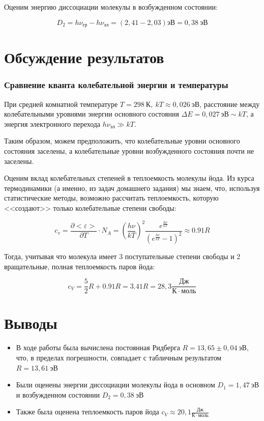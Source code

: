 \documentclass[a4paper,12pt]{article}
\begin{document}
Оценим энергию диссоциации молекулы в возбужденном состоянии:

$$
	D_2 = h\nu_{гр} -  h\nu_{эл} = (2,41 - 2,03) эВ = 0,38 \ эВ
$$

\section*{Обсуждение результатов}

\subsubsection*{Сравнение кванта колебательной энергии и температуры}

При средней комнатной температуре $T = 298 \ К, \ kT \approx 0,026 \ эВ$, расстояние между колебательными уровнями энергии основного состояния $\Delta E = 0,027 \ эВ \sim kT$, а энергия электронного перехода $h\nu_{эл} \gg kT$. 

Таким образом, можем предположить, что колебательные уровни основного состояния заселены, а колебательные уровни возбужденного состояния почти не заселены.

Оценим вклад колебательных степеней в теплоемкость молекулы йода. Из курса термодинамики (а именно, из задач домашнего задания) мы знаем, что, используя статистические методы, возможно рассчитать теплоемкость, которую <<создают>> только колебательные степени свободы:

$$
	c_v = \frac{\partial <\varepsilon>}{\partial T} \cdot N_A = \left(\frac{h\nu}{kT}\right)^2 \frac{e^{\frac{h\nu}{kT}}}{(e^{\frac{h\nu}{kT}} - 1)^2} \approx 0.91 R
$$

Тогда, учитывая что молекула имеет 3 поступательные степени свободы и 2 вращательные, полная теплоемкость паров йода:

$$
	c_V = \frac{5}{2} R + 0.91 R = 3.41 R = 28,3 \frac{Дж}{К \cdot моль}
$$

\section*{Выводы}

\begin{itemize}
	\item В ходе работы была вычислена постоянная Ридберга $R = 13,65 \pm 0,04 \ эВ$, что, в пределах погрешности, совпадает с табличным результатом $R = 13,61 \ эВ$
	\item Были оценены энергии диссоциации молекулы йода в основном $D_1 = 1,47 \ эВ$ и возбужденном состоянии $D_2 = 0,38 \ эВ$
	\item Также была оценена теплоемкость паров  йода $c_V \approx 20,1 \frac{Дж}{К \cdot моль} $
\end{itemize}
\end{document}
